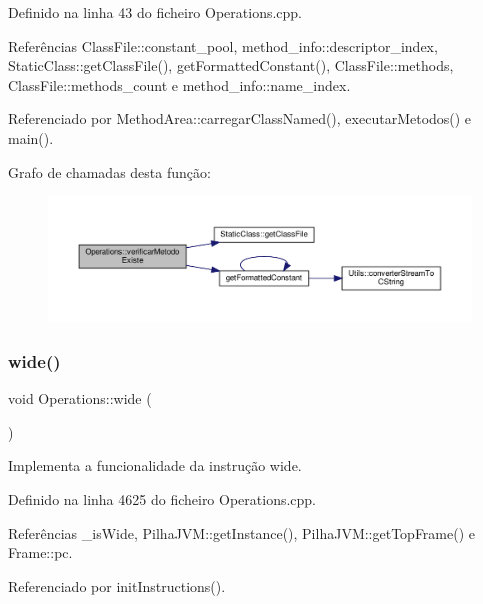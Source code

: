 Definido na linha 43 do ficheiro Operations.\+cpp.



Referências Class\+File\+::constant\+\_\+pool, method\+\_\+info\+::descriptor\+\_\+index, Static\+Class\+::get\+Class\+File(), get\+Formatted\+Constant(), Class\+File\+::methods, Class\+File\+::methods\+\_\+count e method\+\_\+info\+::name\+\_\+index.



Referenciado por Method\+Area\+::carregar\+Class\+Named(), executar\+Metodos() e main().

Grafo de chamadas desta função\+:\nopagebreak
\begin{figure}[H]
\begin{center}
\leavevmode
\includegraphics[width=350pt]{classOperations_a397caddc1ff805c556d3b71c9e525e3f_cgraph}
\end{center}
\end{figure}
\mbox{\label{classOperations_ab1474dfc4eb5142361b00d185f0a4a2b}} 
\subsubsection{\texorpdfstring{wide()}{wide()}}
{\footnotesize\ttfamily void Operations\+::wide (\begin{DoxyParamCaption}{ }\end{DoxyParamCaption})\hspace{0.3cm}{\ttfamily [private]}}



Implementa a funcionalidade da instrução wide. 



Definido na linha 4625 do ficheiro Operations.\+cpp.



Referências \+\_\+is\+Wide, Pilha\+J\+V\+M\+::get\+Instance(), Pilha\+J\+V\+M\+::get\+Top\+Frame() e Frame\+::pc.



Referenciado por init\+Instructions().

